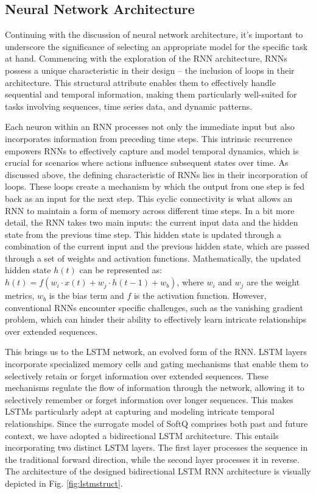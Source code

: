 \subsection{Neural Network Architecture}
Continuing with the discussion of neural network architecture, it's important to underscore the significance of selecting an appropriate model for the specific task at hand. Commencing with the exploration of the \ac{RNN} architecture, \ac{RNN}s possess a unique characteristic in their design – the inclusion of loops in their architecture. This structural attribute enables them to effectively handle sequential and temporal information, making them particularly well-suited for tasks involving sequences, time series data, and dynamic patterns.

Each neuron within an \ac{RNN} processes not only the immediate input but also incorporates information from preceding time steps. This intrinsic recurrence empowers \ac{RNN}s to effectively capture and model temporal dynamics, which is crucial for scenarios where actions influence subsequent states over time. As discussed above, the defining characteristic of RNNs lies in their incorporation of loops. These loops create a mechanism by which the output from one step is fed back as an input for the next step. This cyclic connectivity is what allows an RNN to maintain a form of memory across different time steps. In a bit more detail, the RNN takes two main inputs: the current input data and the hidden state from the previous time step. This hidden state is updated through a combination of the current input and the previous hidden state, which are passed through a set of weights and activation functions. Mathematically, the updated hidden state $h(t)$ can be represented as: $h(t) = f(w_i\cdot x(t) + w_j\cdot h(t-1) + w_b)$, where $w_i$ and $w_j$ are the weight metrics, $w_b$ is the bias term and $f$ is the activation function. However, conventional RNNs encounter specific challenges, such as the vanishing gradient problem, which can hinder their ability to effectively learn intricate relationships over extended sequences.

This brings us to the \ac{LSTM} network, an evolved form of the RNN. \ac{LSTM} layers incorporate specialized memory cells and gating mechanisms that enable them to selectively retain or forget information over extended sequences. These mechanisms regulate the flow of information through the network, allowing it to selectively remember or forget information over longer sequences. This makes LSTMs particularly adept at capturing and modeling intricate temporal relationships. Since the surrogate model of SoftQ comprises both past and future context, we have adopted a bidirectional \ac{LSTM} architecture. This entails incorporating two distinct \ac{LSTM} layers. The first layer processes the sequence in the traditional forward direction, while the second layer processes it in reverse. The architecture of the designed bidirectional \ac{LSTM} \ac{RNN} architecture is visually depicted in Fig. \ref{fig:lstmstruct}.

